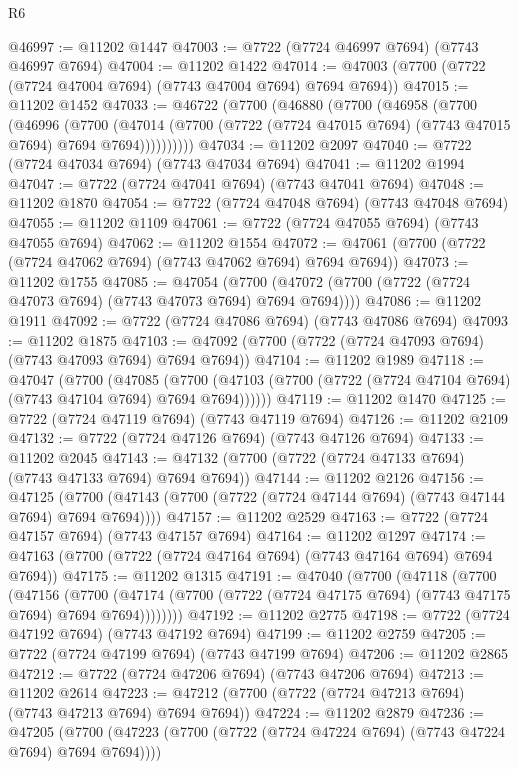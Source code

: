 \begin{lexlean}{R6}
\begin{coremodule}
@46997 := @11202 @1447
@47003 := @7722 (@7724 @46997 @7694) (@7743 @46997 @7694)
@47004 := @11202 @1422
@47014 := @47003 (@7700 (@7722 (@7724 @47004 @7694) (@7743 @47004 @7694) @7694 @7694))
@47015 := @11202 @1452
@47033 := @46722
    (@7700
      (@46880
        (@7700
          (@46958
            (@7700
              (@46996
                (@7700
                  (@47014
                    (@7700 (@7722 (@7724 @47015 @7694) (@7743 @47015 @7694) @7694 @7694))))))))))
@47034 := @11202 @2097
@47040 := @7722 (@7724 @47034 @7694) (@7743 @47034 @7694)
@47041 := @11202 @1994
@47047 := @7722 (@7724 @47041 @7694) (@7743 @47041 @7694)
@47048 := @11202 @1870
@47054 := @7722 (@7724 @47048 @7694) (@7743 @47048 @7694)
@47055 := @11202 @1109
@47061 := @7722 (@7724 @47055 @7694) (@7743 @47055 @7694)
@47062 := @11202 @1554
@47072 := @47061 (@7700 (@7722 (@7724 @47062 @7694) (@7743 @47062 @7694) @7694 @7694))
@47073 := @11202 @1755
@47085 := @47054
    (@7700 (@47072 (@7700 (@7722 (@7724 @47073 @7694) (@7743 @47073 @7694) @7694 @7694))))
@47086 := @11202 @1911
@47092 := @7722 (@7724 @47086 @7694) (@7743 @47086 @7694)
@47093 := @11202 @1875
@47103 := @47092 (@7700 (@7722 (@7724 @47093 @7694) (@7743 @47093 @7694) @7694 @7694))
@47104 := @11202 @1989
@47118 := @47047
    (@7700
      (@47085
        (@7700 (@47103 (@7700 (@7722 (@7724 @47104 @7694) (@7743 @47104 @7694) @7694 @7694))))))
@47119 := @11202 @1470
@47125 := @7722 (@7724 @47119 @7694) (@7743 @47119 @7694)
@47126 := @11202 @2109
@47132 := @7722 (@7724 @47126 @7694) (@7743 @47126 @7694)
@47133 := @11202 @2045
@47143 := @47132 (@7700 (@7722 (@7724 @47133 @7694) (@7743 @47133 @7694) @7694 @7694))
@47144 := @11202 @2126
@47156 := @47125
    (@7700 (@47143 (@7700 (@7722 (@7724 @47144 @7694) (@7743 @47144 @7694) @7694 @7694))))
@47157 := @11202 @2529
@47163 := @7722 (@7724 @47157 @7694) (@7743 @47157 @7694)
@47164 := @11202 @1297
@47174 := @47163 (@7700 (@7722 (@7724 @47164 @7694) (@7743 @47164 @7694) @7694 @7694))
@47175 := @11202 @1315
@47191 := @47040
    (@7700
      (@47118
        (@7700
          (@47156
            (@7700
              (@47174 (@7700 (@7722 (@7724 @47175 @7694) (@7743 @47175 @7694) @7694 @7694))))))))
@47192 := @11202 @2775
@47198 := @7722 (@7724 @47192 @7694) (@7743 @47192 @7694)
@47199 := @11202 @2759
@47205 := @7722 (@7724 @47199 @7694) (@7743 @47199 @7694)
@47206 := @11202 @2865
@47212 := @7722 (@7724 @47206 @7694) (@7743 @47206 @7694)
@47213 := @11202 @2614
@47223 := @47212 (@7700 (@7722 (@7724 @47213 @7694) (@7743 @47213 @7694) @7694 @7694))
@47224 := @11202 @2879
@47236 := @47205
    (@7700 (@47223 (@7700 (@7722 (@7724 @47224 @7694) (@7743 @47224 @7694) @7694 @7694))))

\end{coremodule}
\end{lexlean}
